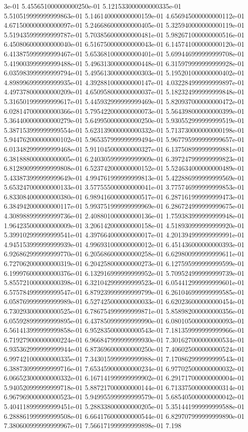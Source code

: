 3e-01	5.455651000000000250e-01	5.121533000000000335e-01	5.510519999999999863e-01	5.146140000000000159e-01	4.656945000000000112e-01	4.671500000000000097e-01	5.246686000000000405e-01	5.325940000000000119e-01	5.519435999999999787e-01	5.703856000000000481e-01	5.982671000000000516e-01	6.450806000000000040e-01	6.516750000000000043e-01	6.145741000000000120e-01	6.413875999999999467e-01	5.653681000000000401e-01	5.699446999999999708e-01	5.419003999999999488e-01	5.496313000000000448e-01	6.315979999999999928e-01	6.035983999999999794e-01	5.495613000000000303e-01	5.195201000000000402e-01	4.898996999999999935e-01	4.392881000000000147e-01	4.032284999999999897e-01	4.497378000000000209e-01	4.650958000000000037e-01	5.182324999999999848e-01	5.316501999999999617e-01	5.445932999999999469e-01	5.820937000000000472e-01	6.028147000000000366e-01	5.795422000000000073e-01	5.564398000000000399e-01	5.364400000000000279e-01	5.649950000000000250e-01	5.930552999999999519e-01	5.387153999999999554e-01	5.623139000000000332e-01	5.713730000000000198e-01	5.944762000000000102e-01	5.965357999999999494e-01	5.967795999999999657e-01	6.013482999999999468e-01	5.911045000000000327e-01	6.137508999999999881e-01	6.381888000000000005e-01	6.240305999999999909e-01	6.397247999999999823e-01	6.812890999999999808e-01	6.523742000000000152e-01	5.524634000000000489e-01	5.433873999999999649e-01	4.994761999999999813e-01	5.422886999999999569e-01	5.653247000000000133e-01	3.577555000000000041e-01	3.775746999999999853e-01	6.833084000000000380e-01	6.989416000000000517e-01	6.287161999999999473e-01	6.384942000000000117e-01	5.993751999999999969e-01	6.286724999999999675e-01	4.308988999999999736e-01	2.408801000000000136e-01	1.759383999999999948e-01	1.964235000000000009e-01	3.206142000000000158e-01	4.518930999999999920e-01	5.399102999999999541e-01	4.397664000000000017e-01	4.201394999999999991e-01	4.945153999999999939e-01	4.996931000000000012e-01	6.451436000000000393e-01	6.926862999999999770e-01	6.205686000000000258e-01	6.629800999999999611e-01	6.727062000000000319e-01	6.204258000000000273e-01	6.127595999999999599e-01	6.199976000000000376e-01	6.132916999999999952e-01	5.709524999999999739e-01	5.855721000000000398e-01	6.321042999999999523e-01	6.054412999999999601e-01	6.575784999999999547e-01	6.879239999999999799e-01	6.261046999999999585e-01	6.058769999999999989e-01	6.527425000000000033e-01	6.620236000000000454e-01	6.730293000000000525e-01	6.786754999999999871e-01	5.858982000000000356e-01	6.055928999999999895e-01	6.437850999999999990e-01	6.080105000000000093e-01	6.561413999999999858e-01	6.952835000000000543e-01	7.181359999999999966e-01	6.719279000000000224e-01	6.966847999999999930e-01	7.301627000000000534e-01	6.935362999999999944e-01	6.873696000000000250e-01	7.406025000000000524e-01	6.997421000000000335e-01	7.343015999999999988e-01	7.170862999999999543e-01	6.388730999999999716e-01	7.653459000000000234e-01	6.977025000000000032e-01	6.066523000000000332e-01	6.167141999999999902e-01	6.291717000000000004e-01	5.940520999999999718e-01	5.887217000000000144e-01	6.713375000000000314e-01	6.967969000000000523e-01	5.949955999999999579e-01	5.685405000000000042e-01	5.404118999999999451e-01	5.288338000000000205e-01	5.351441999999999588e-01	6.288861999999999508e-01	6.664176000000000544e-01	6.829707999999999890e-01	7.380600999999999967e-01	7.566171999999999898e-01	7.198